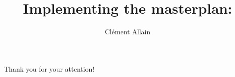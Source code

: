 \documentclass[aspectratio=169, xcolor=dvipsnames]{beamer}
\title{
  Implementing the \raisebox{-0.2cm}{\texttt{[image: images/iris.png]}} masterplan: \OCaml
}
\author{
  Clément Allain
}
\begin{document}

\begin{frame}
\titlepage
\end{frame}










\begin{frame}
\centering
\huge
Thank you for your attention!
\end{frame}

\end{document}
